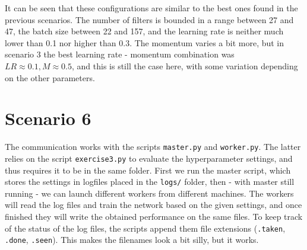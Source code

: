 \documentclass{article}
\begin{document}
        It can be seen that these configurations are similar to the best ones found in the previous scenarios.
        The number of filters is bounded in a range between 27 and 47, the batch size between 22 and 157, and
        the learning rate is neither much lower than 0.1 nor higher than 0.3. The momentum varies a bit more, 
        but in scenario 3 the best learning rate - momentum combination was $LR \approx 0.1, M \approx 0.5$, and this is still the case here, 
        with some variation depending on the other parameters.
    
    
\section{Scenario 6}
    The communication works with the scripts \texttt{master.py} and \texttt{worker.py}. The latter relies on the script \texttt{exercise3.py} to evaluate the hyperparameter settings, and thus requires it to be in the same folder.
    First we run the master script, which stores the settings in logfiles placed in the \texttt{logs/} folder, then - with master still running - we can launch different workers from different machines.
    The workers will read the log files and train the network based on the given settings, and once finished they will write the obtained performance on the same files. 
    To keep track of the status of the log files, the scripts append them file extensions (\texttt{.taken}, \texttt{.done}, \texttt{.seen}). This makes the filenames look a bit silly, but it works.
    
\end{document}
